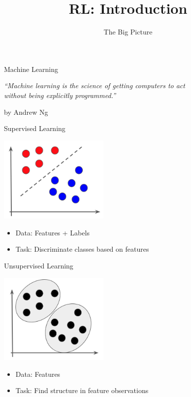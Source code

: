 \documentclass[aspectratio=169]{../latex_main/tntbeamer}  %
\title[ML-RL: Big Picture]{RL: Introduction}
\subtitle{The Big Picture}
\begin{document}
	
	\maketitle

\begin{frame}[c]{Machine Learning}

\centering
\textit{``Machine learning is the science of getting computers to act\\
 without being explicitly programmed.''}

\hfill by Andrew Ng

\end{frame}
\begin{frame}[c]{Supervised Learning}
	
\centering
\includegraphics[width=0.4\textwidth]{images/classification.png}

\bigskip

\begin{itemize}
	\item Data: Features + Labels
	\item Task: Discriminate classes based on features
\end{itemize}	

	
\end{frame}
\begin{frame}[c]{Unsupervised Learning}
	
	\centering
	\includegraphics[width=0.4\textwidth]{images/clustering.png}
	
	\bigskip
	
	\begin{itemize}
		\item Data: Features 
		\item Task: Find structure in feature observations
	\end{itemize}	
	
	
\end{frame}
\end{document}
